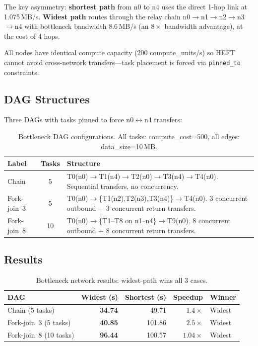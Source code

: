 \documentclass[11pt]{article}
\begin{document}
The key asymmetry: \textbf{shortest path} from n0 to n4 uses the direct
1-hop link at 1.075\,MB/s. \textbf{Widest path} routes through the relay
chain n0$\to$n1$\to$n2$\to$n3$\to$n4 with bottleneck bandwidth 8.6\,MB/s
(an $8\times$ bandwidth advantage), at the cost of 4 hops.

All nodes have identical compute capacity (200 compute\_units/s) so HEFT
cannot avoid cross-network transfers---task placement is forced via
\texttt{pinned\_to} constraints.

\subsection{DAG Structures}

Three DAGs with tasks pinned to force n0$\leftrightarrow$n4 transfers:

\begin{table}[h]
\centering
\caption{Bottleneck DAG configurations. All tasks: compute\_cost=500, all edges: data\_size=10\,MB.}
\label{tab:bn_dags}
\begin{tabular}{lcp{7.5cm}}
\toprule
Label & Tasks & Structure \\
\midrule
Chain       & 5  & T0(n0)$\to$T1(n4)$\to$T2(n0)$\to$T3(n4)$\to$T4(n0). Sequential transfers, no concurrency. \\
Fork-join~3 & 5  & T0(n0)$\to$\{T1(n2),T2(n3),T3(n4)\}$\to$T4(n0). 3 concurrent outbound + 3 concurrent return transfers. \\
Fork-join~8 & 10 & T0(n0)$\to$\{T1--T8 on n1--n4\}$\to$T9(n0). 8 concurrent outbound + 8 concurrent return transfers. \\
\bottomrule
\end{tabular}
\end{table}

\subsection{Results}

\begin{table}[h]
\centering
\caption{Bottleneck network results: widest-path wins all 3 cases.}
\label{tab:bn_results}
\begin{tabular}{l rr rl}
\toprule
DAG & Widest (s) & Shortest (s) & Speedup & Winner \\
\midrule
Chain (5 tasks)       & \textbf{34.74} & 49.71  & $1.4\times$ & Widest \\
Fork-join~3 (5 tasks) & \textbf{40.85} & 101.86 & $2.5\times$ & Widest \\
Fork-join~8 (10 tasks) & \textbf{96.44} & 100.57 & $1.04\times$ & Widest \\
\bottomrule
\end{tabular}
\end{table}
\end{document}
